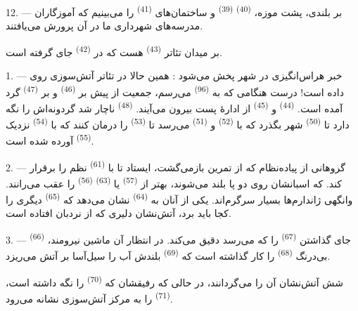 12. --- بر بلندی، پشت موزه،  \textsuperscript{(40)}
 \textsuperscript{(39)} و ساختمان‌های 
\textsuperscript{(41)} را می‌بینیم که آموزگاران مدرسه‌های شهرداری ما در
آن پرورش می‌یافتند.

بر میدان تئاتر  \textsuperscript{(43)} هست که در
 \textsuperscript{(42)} جای گرفته است.

\VUsaut{5.0mm}
\VUsaut{3.0mm}

\VUsaut{3.4mm}
\VUsaut{3.4mm}

1. --- خبر هراس‌انگیزی در شهر پخش می‌شود : همین حالا در تئاتر
آتش‌سوزی روی داده است! درست هنگامی که به 
\textsuperscript{(96)} می‌رسم، جمعیت از پیش بر 
\textsuperscript{(46)} و بر  \textsuperscript{(47)}
گرد آمده است.  \textsuperscript{(44)} و
 \textsuperscript{(45)} از ادارهٔ پست بیرون
می‌آیند.  \textsuperscript{(48)} ناچار شد
گردونه‌اش را نگه دارد تا  \textsuperscript{(50)} شهر
بگذرد که با  \textsuperscript{(52)} و 
\textsuperscript{(51)} می‌رسد تا  \textsuperscript{(53)} را
درمان کنند که با  \textsuperscript{(54)} نزدیک
 \textsuperscript{(55)} آورده شده است.

2. --- گروهانی از پیاده‌نظام که از تمرین بازمی‌گشت، ایستاد تا با
 \textsuperscript{(61)} نظم را
برقرار کند.  که اسبانشان روی دو پا بلند می‌شوند، بهتر
از  \textsuperscript{(57)} یا 
\textsuperscript{(63)}  \textsuperscript{(56)} را عقب
می‌رانند. وانگهی ژاندارم‌ها بسیار سرگرم‌اند. یکی از آنان به
 \textsuperscript{(64)} نشان می‌دهد که
 \textsuperscript{(65)} دیگری را کجا باید برد، آتش‌نشان
دلیری که از نردبان افتاده است.

3. ---  \textsuperscript{(66)} جای گذاشتن  \textsuperscript{(67)} را که می‌رسد دقیق می‌کند. در انتظار آن
ماشین نیرومند، بی‌درنگ  \textsuperscript{(68)} را
کار گذاشته است که  \textsuperscript{(69)} بلندش آب را
سیل‌آسا بر آتش می‌ریزد.

شش آتش‌نشان آن را می‌گردانند، در حالی که رفیقشان که 
\textsuperscript{(70)} را نگه داشته است، 
\textsuperscript{(71)} را به مرکز آتش‌سوزی نشانه می‌رود.


